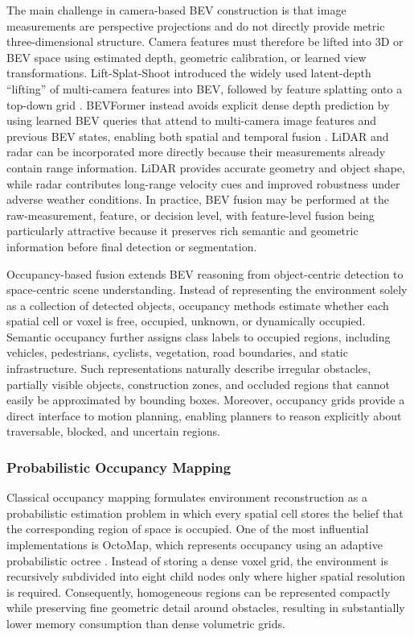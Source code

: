 \documentclass{ieeeaccess}
\begin{document}
The main challenge in camera-based BEV construction is that image measurements are perspective projections and do not directly provide metric three-dimensional structure. Camera features must therefore be lifted into 3D or BEV space using estimated depth, geometric calibration, or learned view transformations. Lift-Splat-Shoot introduced the widely used latent-depth ``lifting'' of multi-camera features into BEV, followed by feature splatting onto a top-down grid \cite{philion2020_lss}. BEVFormer instead avoids explicit dense depth prediction by using learned BEV queries that attend to multi-camera image features and previous BEV states, enabling both spatial and temporal fusion \cite{li2022_bevformer}. LiDAR and radar can be incorporated more directly because their measurements already contain range information. LiDAR provides accurate geometry and object shape, while radar contributes long-range velocity cues and improved robustness under adverse weather conditions. In practice, BEV fusion may be performed at the raw-measurement, feature, or decision level, with feature-level fusion being particularly attractive because it preserves rich semantic and geometric information before final detection or segmentation.

Occupancy-based fusion extends BEV reasoning from object-centric detection to space-centric scene understanding. Instead of representing the environment solely as a collection of detected objects, occupancy methods estimate whether each spatial cell or voxel is free, occupied, unknown, or dynamically occupied. Semantic occupancy further assigns class labels to occupied regions, including vehicles, pedestrians, cyclists, vegetation, road boundaries, and static infrastructure. Such representations naturally describe irregular obstacles, partially visible objects, construction zones, and occluded regions that cannot easily be approximated by bounding boxes. Moreover, occupancy grids provide a direct interface to motion planning, enabling planners to reason explicitly about traversable, blocked, and uncertain regions.

\subsubsection{Probabilistic Occupancy Mapping}

Classical occupancy mapping formulates environment reconstruction as a probabilistic estimation problem in which every spatial cell stores the belief that the corresponding region of space is occupied. One of the most influential implementations is OctoMap, which represents occupancy using an adaptive probabilistic octree \cite{hornung2013_octomap}. Instead of storing a dense voxel grid, the environment is recursively subdivided into eight child nodes only where higher spatial resolution is required. Consequently, homogeneous regions can be represented compactly while preserving fine geometric detail around obstacles, resulting in substantially lower memory consumption than dense volumetric grids.
\end{document}
